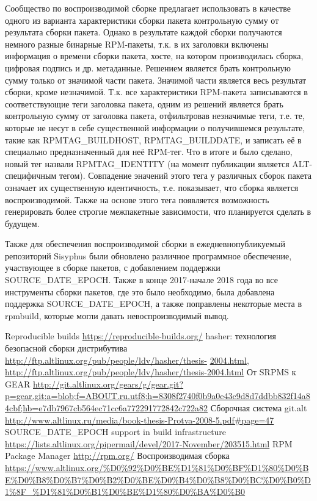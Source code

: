 \documentclass[10pt, a5paper]{article}
\begin{document}
Сообщество по воспроизводимой сборке предлагает использовать в качестве одного из варианта характеристики сборки пакета контрольную сумму от результата сборки пакета. Однако в результате каждой сборки получаются немного разные бинарные RPM-пакеты, т.к. в их заголовки включены информация о времени сборки пакета, хосте, на котором производилась сборка, цифровая подпись и др. метаданные. Решением является брать контрольную сумму только от значимой части пакета. Значимой части является весь результат сборки, кроме незначимой. Т.к. все характеристики RPM-пакета записываются в соответствующие теги заголовка пакета, одним из решений является брать контрольную сумму от заголовка пакета, отфильтровав незначимые теги, т.е. те, которые не несут в себе существенной информации о получившемся результате, такие как RPMTAG\_BUILDHOST, RPMTAG\_BUILDDATE, и записать её в специально предназначенный для неё RPM-тег. Что в итоге и было сделано, новый тег назвали RPMTAG\_IDENTITY (на момент публикации является ALT-специфичным тегом). Совпадение эначений этого тега у различных сборок пакета означает их существенную идентичность, т.е. показывает, что сборка является воспроизводимой. Также на основе этого тега появляется возможность генерировать более строгие межпакетные зависимости, что планируется сделать в будущем.

Также для обеспечения воспроизводимой сборки в ежедневнопубликуемый репозиторий Sisyphus были обновлено различное программное обеспечение, участвующее в сборке пакетов, с добавлением поддержки SOURCE\_DATE\_EPOCH. Также в конце 2017-начале 2018 года во все инструменты сборки пакетов, где это было необходимо, была добавлена поддержка SOURCE\_DATE\_EPOCH, а также поправлены некоторые места в rpmbuild, которые могли давать невоспроизводимый вывод.

\begin{thebibliography}{20}
 Reproducible builds \url{https://reproducible-builds.org/}
 hasher: технология безопасной сборки дистрибутива \url{http://ftp.altlinux.org/pub/people/ldv/hasher/thesis-} \url{2004.html}, \url{http://ftp.altlinux.org/pub/people/ldv/hasher/thesis-2004.html}
 От SRPMS к GEAR \url{http://git.altlinux.org/gears/g/gear.git?p=gear.git;a=blob;f=ABOUT.ru.utf8;h=8308f2740f0b9a0e43c9d8d7ddbb832f14a84cbf;hb=e7db7967cb564ec71cc6a772291772842c722a82}
 Сборочная система git.alt \url{http://www.altlinux.ru/media/book-thesis-Protva-2008-5.pdf#page=47}
 SOURCE\_DATE\_EPOCH support in build infrastructure \url{https://lists.altlinux.org/pipermail/devel/2017-November/203515.html}
 RPM Package Manager \url{http://rpm.org/}
 Воспроизводимая сборка \url{https://www.altlinux.org/%D0%92%D0%BE%D1%81%D0%BF%D1%80%D0%BE%D0%B8%D0%B7%D0%B2%D0%BE%D0%B4%D0%B8%D0%BC%D0%B0%D1%8F_%D1%81%D0%B1%D0%BE%D1%80%D0%BA%D0%B0}
\end{thebibliography}
\end{document}
